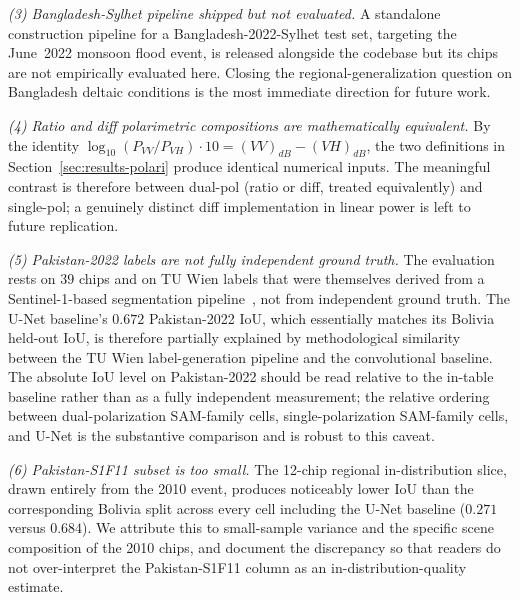 \documentclass[conference]{IEEEtran}
\begin{document}
\textit{(3) Bangladesh-Sylhet pipeline shipped but not evaluated.} A standalone construction pipeline for a Bangladesh-2022-Sylhet test set, targeting the June~2022 monsoon flood event, is released alongside the codebase but its chips are not empirically evaluated here. Closing the regional-generalization question on Bangladesh deltaic conditions is the most immediate direction for future work.

\textit{(4) Ratio and diff polarimetric compositions are mathematically equivalent.} By the identity $\log_{10}(P_{VV}/P_{VH})\cdot 10 = (VV)_{dB} - (VH)_{dB}$, the two definitions in Section~\ref{sec:results-polari} produce identical numerical inputs. The meaningful contrast is therefore between dual-pol (ratio or diff, treated equivalently) and single-pol; a genuinely distinct diff implementation in linear power is left to future replication.

\textit{(5) Pakistan-2022 labels are not fully independent ground truth.} The evaluation rests on $39$ chips and on TU Wien labels that were themselves derived from a Sentinel-1-based segmentation pipeline~\cite{Roth2023Pakistan}, not from independent ground truth. The U-Net baseline's $0.672$ Pakistan-2022 IoU, which essentially matches its Bolivia held-out IoU, is therefore partially explained by methodological similarity between the TU Wien label-generation pipeline and the convolutional baseline. The absolute IoU level on Pakistan-2022 should be read relative to the in-table baseline rather than as a fully independent measurement; the relative ordering between dual-polarization SAM-family cells, single-polarization SAM-family cells, and U-Net is the substantive comparison and is robust to this caveat.

\textit{(6) Pakistan-S1F11 subset is too small.} The 12-chip regional in-distribution slice, drawn entirely from the 2010 event, produces noticeably lower IoU than the corresponding Bolivia split across every cell including the U-Net baseline ($0.271$ versus $0.684$). We attribute this to small-sample variance and the specific scene composition of the 2010 chips, and document the discrepancy so that readers do not over-interpret the Pakistan-S1F11 column as an in-distribution-quality estimate.
\end{document}
